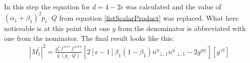 %
%
In this step the equation for $ d = 4-2 \epsilon $ was calculated and the value of $ ({\alpha_1}+{\beta_1})^2 p_i \cdot Q $ from equation \eqref{fistScalarProduct} was replaced. What here noticeable is at this point that one $ y $ from the denominator is abbreviated with one from the nominator. The final result looks like this:
\begin{equation}
\begin{split}
{|{M}^{\prime}_1|}^2 =\frac{g_s^2 \:f^{\:a\:o\:l}\: f^{\:a\:k\:o}}{y\:(p_i\cdot Q)}[2[\epsilon-1]{\beta_1}(1-\beta_1){n^{{\eta}}}_{\bot,1}{n^{{\eta}^{\prime}}}_{\bot,1}-2g^{{\eta}{{\eta}^{\prime}}}][g^{{\gamma}{{\delta}}}]
\end{split}
\end{equation}

\pagebreak

